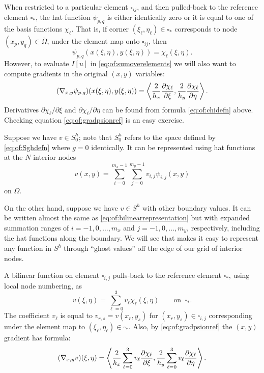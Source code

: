 When restricted to a particular element $\square_{ij}$, and then pulled-back to the reference element $\square_\ast$, the hat function $\psi_{p,q}$ is either identically zero or it is equal to one of the basis functions $\chi_\ell$.  That is, if corner $(\xi_\ell,\eta_\ell) \in \square_\ast$ corresponds to node $(x_p,y_q) \in \overline\Omega$, under the element map onto $\square_{ij}$, then
\begin{equation}
  \psi_{p,q}(x(\xi,\eta),y(\xi,\eta)) = \chi_\ell(\xi,\eta).  \label{eq:of:psionref}
\end{equation}
However, to evaluate $I[u]$ in \eqref{eq:of:sumoverelements} we will also want to compute gradients in the original $(x,y)$ variables:
\begin{equation}
  (\nabla_{x,y} \psi_{p,q})(x(\xi,\eta),y(\xi,\eta)) = \left<\frac{2}{h_x}\frac{\partial\chi_\ell}{\partial \xi},\frac{2}{h_y}\frac{\partial\chi_\ell}{\partial \eta}\right>.   \label{eq:of:gradpsionref}
\end{equation}
Derivatives $\partial\chi_\ell/\partial \xi$ and $\partial\chi_\ell/\partial \eta$ can be found from formula \eqref{eq:of:chidefn} above.  Checking equation \eqref{eq:of:gradpsionref} is an easy exercise.

Suppose we have $v \in S_0^h$; note that $S_0^h$ refers to the space defined by \eqref{eq:of:Sghdefn} where $g=0$ identically.  It can be represented using hat functions at the $N$ interior nodes
\begin{equation}
v(x,y) = \sum_{i=0}^{m_x-1} \sum_{j=0}^{m_y-1} v_{i,j} \psi_{i,j}(x,y) \label{eq:of:bilinearrepresentation}
\end{equation}
on $\Omega$.

On the other hand, suppose we have $v \in S^h$ with other boundary values.  It can be written almost the same as \eqref{eq:of:bilinearrepresentation} but with expanded summation ranges of $i=-1,0,\dots,m_x$ and $j=-1,0,\dots,m_y$, respectively, including the hat functions along the boundary.  We will see that \PETSc makes it easy to represent any function in $S^h$ through ``ghost values'' off the edge of our grid of interior nodes.

A bilinear function on element $\square_{i,j}$ pulls-back to the reference element $\square_\ast$, using local node numbering, as
\begin{equation}
v(\xi,\eta) = \sum_{\ell=0}^3 v_\ell \chi_\ell(\xi,\eta)  \qquad \text{on } \,\square_\ast. \label{eq:of:bilinearref}
\end{equation}
The coefficient $v_\ell$ is equal to $v_{r,s} = v(x_r,y_s)$ for $(x_r,y_s)\in\square_{i,j}$ corresponding under the element map to $(\xi_\ell,\eta_\ell) \in \square_\ast$.  Also, by \eqref{eq:of:gradpsionref} the $(x,y)$ gradient has formula:
\begin{equation}
  (\nabla_{x,y} v)(\xi,\eta) = \left<\frac{2}{h_x} \sum_{\ell=0}^3 v_\ell \frac{\partial\chi_\ell}{\partial \xi}, \frac{2}{h_y} \sum_{\ell=0}^3 v_\ell \frac{\partial\chi_\ell}{\partial \eta}\right>. \label{eq:of:gradrepref}
\end{equation}


